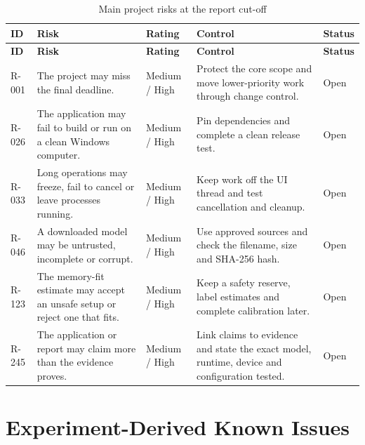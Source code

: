 \begingroup
\small
\setlength{\LTpre}{4pt}
\setlength{\LTpost}{4pt}
\renewcommand{\arraystretch}{0.96}
\begin{longtable}{@{}P{0.09\dimexpr{}\tabcolsep\relax}P{0.30\dimexpr{}\tabcolsep\relax}P{0.16\dimexpr{}\tabcolsep\relax}P{0.31\dimexpr{}\tabcolsep\relax}P{0.14\dimexpr{}\tabcolsep\relax}@{}}
    \caption{Main project risks at the report cut-off}
    \label{tab:risk-register} \\
    \toprule
    \textbf{ID} & \textbf{Risk} & \textbf{Rating} &
    \textbf{Control} & \textbf{Status} \\
    \midrule
    \endfirsthead

    \toprule
    \textbf{ID} & \textbf{Risk} & \textbf{Rating} &
    \textbf{Control} & \textbf{Status} \\
    \midrule
    \endhead

    R-001 & The project may miss the final deadline. & Medium / High &
    Protect the core scope and move lower-priority work through change control. & Open \\

    R-026 & The application may fail to build or run on a clean Windows computer. &
    Medium / High & Pin dependencies and complete a clean release test. & Open \\

    R-033 & Long operations may freeze, fail to cancel or leave processes running. &
    Medium / High & Keep work off the UI thread and test cancellation and cleanup. & Open \\

    R-046 & A downloaded model may be untrusted, incomplete or corrupt. &
    Medium / High & Use approved sources and check the filename, size and SHA-256 hash. & Open \\

    R-123 & The memory-fit estimate may accept an unsafe setup or reject one that fits. &
    Medium / High & Keep a safety reserve, label estimates and complete
    calibration later. & Open \\

    R-245 & The application or report may claim more than the evidence proves. &
    Medium / High & Link claims to evidence and state the exact model, runtime, device and
    configuration tested. & Open \\
    \bottomrule
\end{longtable}
\endgroup

\section{Experiment-Derived Known Issues}

